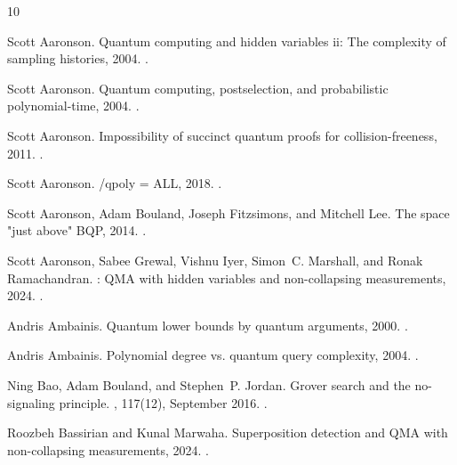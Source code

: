 \documentclass[10pt,a4paper]{article}
\begin{document}
\begin{thebibliography}{10}

Scott Aaronson.
\newblock Quantum computing and hidden variables ii: The complexity of sampling histories, 2004.
\newblock \href {https://arxiv.org/abs/quant-ph/0408119} {}.

Scott Aaronson.
\newblock Quantum computing, postselection, and probabilistic polynomial-time, 2004.
\newblock \href {https://arxiv.org/abs/quant-ph/0412187} {}.

Scott Aaronson.
\newblock Impossibility of succinct quantum proofs for collision-freeness, 2011.
\newblock \href {https://arxiv.org/abs/1101.0403} {}.

Scott Aaronson.
/qpoly = {ALL}, 2018.
\newblock \href {https://arxiv.org/abs/1805.08577} {}.

Scott Aaronson, Adam Bouland, Joseph Fitzsimons, and Mitchell Lee.
\newblock The space "just above" {BQP}, 2014.
\newblock \href {https://arxiv.org/abs/1412.6507} {}.

Scott Aaronson, Sabee Grewal, Vishnu Iyer, Simon~C. Marshall, and Ronak Ramachandran.
: {QMA} with hidden variables and non-collapsing measurements, 2024.
\newblock \href {https://arxiv.org/abs/2403.02543} {}.

Andris Ambainis.
\newblock Quantum lower bounds by quantum arguments, 2000.
\newblock \href {https://arxiv.org/abs/quant-ph/0002066} {}.

Andris Ambainis.
\newblock Polynomial degree vs. quantum query complexity, 2004.
\newblock \href {https://arxiv.org/abs/quant-ph/0305028} {}.

Ning Bao, Adam Bouland, and Stephen~P. Jordan.
\newblock Grover search and the no-signaling principle.
, 117(12), September 2016.
\newblock \href {https://doi.org/10.1103/physrevlett.117.120501} {}.

Roozbeh Bassirian and Kunal Marwaha.
\newblock Superposition detection and {QMA} with non-collapsing measurements, 2024.
\newblock \href {https://arxiv.org/abs/2403.02532} {}.


\end{thebibliography}
\end{document}
